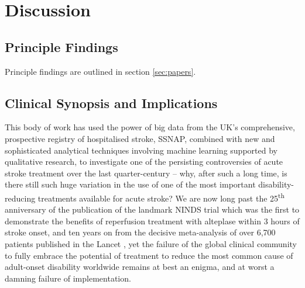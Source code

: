 \section{Discussion}

\subsection{Principle Findings}

Principle findings are outlined in section \ref{sec:papers}.

\subsection{Clinical Synopsis and Implications}

This body of work has used the power of big data from the UK’s comprehensive, prospective registry of hospitalised stroke, SSNAP, combined with new and sophisticated analytical techniques involving machine learning supported by qualitative research, to investigate one of the persisting controversies of acute stroke treatment over the last quarter-century – why, after such a long time, is there still such huge variation in the use of one of the most important disability-reducing treatments available for acute stroke? We are now long past the 25\textsuperscript{th} anniversary of the publication of the landmark NINDS trial which was the first to demonstrate the benefits of reperfusion treatment with alteplase within 3 hours of stroke onset, and ten years on from the decisive meta-analysis of over 6,700 patients published in the Lancet \cite{emberson_effect_2014}, yet the failure of the global clinical community to fully embrace the potential of treatment to reduce the most common cause of adult-onset disability worldwide remains at best an enigma, and at worst a damning failure of implementation.

